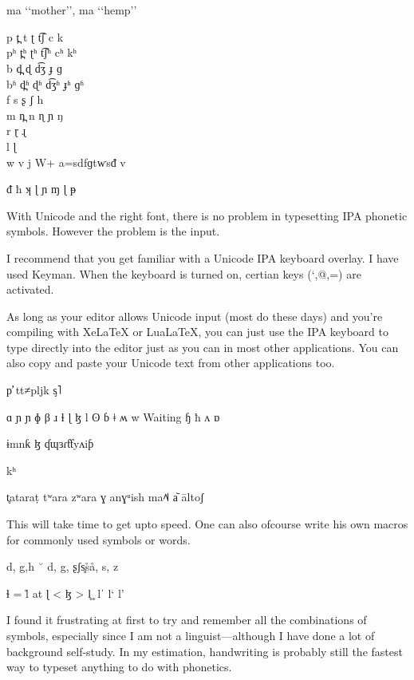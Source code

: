 \begin{IPA}
\\
\\
ma ‘‘mother’’, ma ‘‘hemp’’


\end{IPA}

\LARGE
\noindent p t̪ t ʈ t͡ʃ c k\\
pʰ t̪ʰ ʈʰ t͡ʃʰ cʰ kʰ \\
b d̪ ɖ d͡ʒ ɟ ɡ \\
bʱ d̪ʱ ɖʱ d͡ʒʱ ɟʱ ɡʱ \\
f s ʂ ʃ h \\
m n̪ n ɳ ɲ ŋ \\
r ɽ ͏ɻ\\
l ɭ \\
w v j
W+ 
a=sdfɡtⱳsᵭ v

ᵭ ħ ʞ ɭ ɲ ɱ ɭ ᵽ 
\egroup


With Unicode and the right font, there is no problem  in typesetting IPA phonetic symbols. However the problem is the input.

I recommend that you get familiar with a Unicode IPA keyboard overlay. I have used Keyman. When the keyboard is turned on, certian keys (`,@,=) are activated.

As long as your editor allows Unicode input (most do these days) and you're compiling with XeLaTeX or LuaLaTeX, you can just use the IPA keyboard to type directly into the editor just as you can in most other applications. You can also copy and paste your Unicode text from other applications too.

p̛ tt≠pljk ᶊ˥



ɑ ɲ ɲ ɸ β ɹ ɬ ɭ ɮ l ʘ ɓ ǂ ʍ w Waiting ɧ ħ ʌ ɒ 

ɨmnƙ ɮ ʠɰɜɾƭƭyʌiƥ

kʰ 

t̥ataraṭ tʷara zʷara ɣ anɣᵘish ma˨˥˨ a᷅ āltoʃ

This will take time to get upto speed. One can also ofcourse write his own macros for commonly used symbols or words.

d, g,h
˘
d, g, ʂʃs̥s̊å, s, z 

ɬ = 
l̊ at
ɭ  < 
ɮ  >
l̥  ̥
lˈ 
l` l'

I found it frustrating at first to try and remember all the combinations of symbols, especially since I am not a linguist---although I have done a lot of background self-study. In my estimation, handwriting is probably still the fastest way to typeset anything to do with phonetics.

